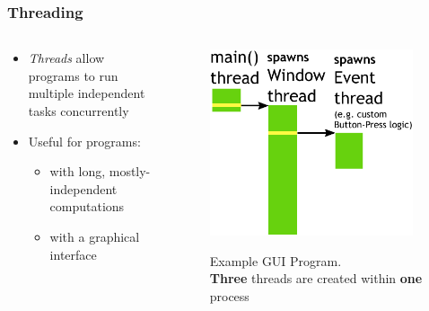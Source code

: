 \documentclass{beamer}
\newcommand{\linespace}{\vskip 0.25cm}
\begin{document}
\begin{frame}
\frametitle{Threading}

\begin{columns}
	\begin{column}{0.5\textwidth}
		\begin{itemize}
	
		\item \emph{Threads} allow programs to run multiple independent tasks concurrently	
		
		\linespace
		\linespace
		
		\item Useful for programs:
			\begin{itemize}
  			 \item with long, mostly-independent computations
			 \item with a graphical interface
	  		\end{itemize}
		\end{itemize}
	\end{column}
	
	\begin{column}{0.5\textwidth}
		\begin{figure}
		\includegraphics[width=0.95\textwidth]{Illustrations/ThreadExample_GUI_Part2}
		\label{fig:domains}
		\caption*{Example GUI Program. \\ \textbf{Three} threads are created within \textbf{one} process}
		\end{figure}
	\end{column}
\end{columns}

\end{frame}
\end{document}
